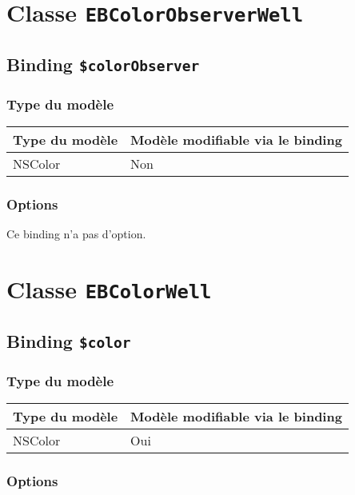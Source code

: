 \section{Classe \texttt{EBColorObserverWell}}

\subsection{Binding \texttt{\$colorObserver}}

\subsubsection{Type du modèle}

\begin{tabular}{|l|l|}
\hline
\textbf{Type du modèle} & \textbf{Modèle modifiable via le binding}\\
\hline
NSColor & Non\\
\hline
\end{tabular}
\subsubsection{Options}

Ce binding n'a pas d'option.








\section{Classe \texttt{EBColorWell}}

\subsection{Binding \texttt{\$color}}

\subsubsection{Type du modèle}

\begin{tabular}{|l|l|}
\hline
\textbf{Type du modèle} & \textbf{Modèle modifiable via le binding}\\
\hline
NSColor & Oui\\
\hline
\end{tabular}
\subsubsection{Options}

